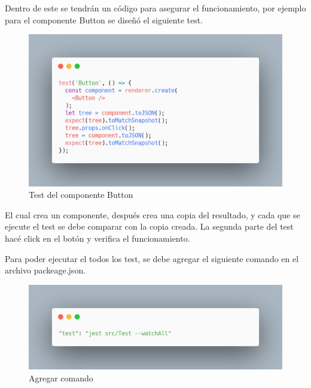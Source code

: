  Dentro de este se tendrán un código para asegurar el funcionamiento, por ejemplo para el componente Button se diseñó el siguiente test.
 \newline
\begin{figure}[H]
    \includegraphics[width=1\textwidth]{./Imagenes/8.41t.png}
    \caption[Test del componente Button]{Test del componente Button}
    \end{figure}
\newline

El cual crea un componente, después crea una copia del resultado, y cada que se ejecute el test se debe comparar con la copia creada.
La segunda parte del test hacé click en el botón y verifica el funcionamiento.

Para poder ejecutar el todos los test, se debe agregar el siguiente comando en el archivo packeage.json.
 \newline
\begin{figure}[H]
    \includegraphics[width=1\textwidth]{./Imagenes/8.42t.png}
    \caption[Agregar comando]{Agregar comando}
    \end{figure}
\newline
\clearpage